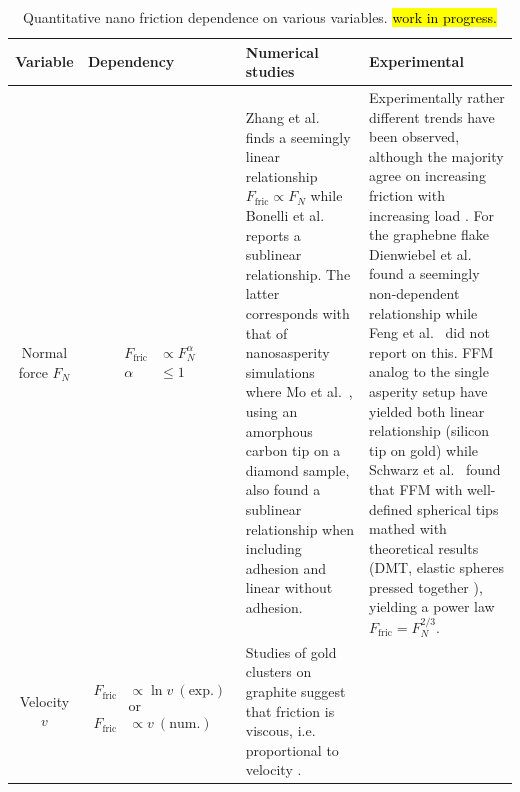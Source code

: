 \begin{table}[H]
  \begin{center}
  \caption{Quantitative nano friction dependence on various variables. \hl{work in progress.}}
  \label{tab:var_dep}
  \begin{tabular}{ | c | C{3cm}| m{5cm}| m{5cm}|} \hline
  \textbf{Variable} & \textbf{Dependency} & \textbf{Numerical studies} & \textbf{Experimental} \\ \hline 
  Normal force $F_N$ 
  & {\begin{align*}
    F_{\text{fric}} &\propto F_N^{\alpha} \\
    \alpha &\le 1
  \end{align*}} 
  & Zhang et al.\ \cite{ma12091425} finds a seemingly linear relationship $F_{\text{fric}} \propto F_N$ while Bonelli et al.\ \cite{bonelli_atomistic_2009} reports a sublinear relationship. The latter corresponds with that of nanosasperity simulations where Mo et al.\ \cite{mo_friction_2009}, using an amorphous carbon tip on a diamond sample, also found a sublinear relationship when including adhesion and linear without adhesion.
  & Experimentally rather different trends have been observed, although the majority agree on increasing friction with increasing load \cite[p. 200]{gnecco_meyer_2015}. For the graphebne flake Dienwiebel et al.\ \cite{DIENWIEBEL2005197} found a seemingly non-dependent relationship while Feng et al.\ \cite{feng_superlubric_2013} did not report on this. FFM analog to the single asperity setup have yielded both linear relationship \cite{gao_frictional_2004} (silicon tip on gold) while Schwarz et al.\ \cite{PhysRevB.56.6987} found that FFM with well-defined spherical tips mathed with theoretical results (DMT, elastic spheres pressed together \cite[p. 200]{gnecco_meyer_2015}), yielding a power law $F_{\text{fric}} = F_N^{2/3}$. 
  \\ \hline
  Velocity $v$ & 
  {\begin{align*}
    F_{\text{fric}} &\propto \ln{v} \ (\text{exp.})\\
    &\text{or} \\
    F_{\text{fric}} &\propto v \ (\text{num.})\\
  \end{align*}}
  &  Studies of gold clusters on graphite suggest that friction is viscous, i.e. proportional to velocity \cite{Manini_2016}.


\end{tabular}
\end{center}
\end{table}
